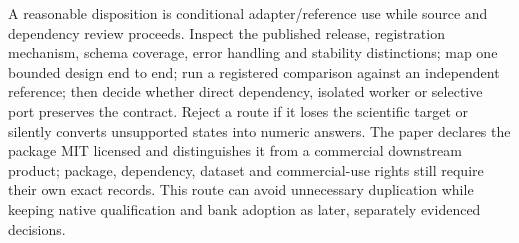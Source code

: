 A reasonable disposition is conditional adapter/reference use while source
and dependency review proceeds. Inspect the published release, registration
mechanism, schema coverage, error handling and stability distinctions; map
one bounded design end to end; run a registered comparison against an
independent reference; then decide whether direct dependency, isolated worker
or selective port preserves the contract. Reject a route if it loses the
scientific target or silently converts unsupported states into numeric
answers. The paper declares the package MIT licensed and distinguishes it
from a commercial downstream product; package, dependency, dataset and
commercial-use rights still require their own exact records. This route
can avoid unnecessary duplication while keeping native qualification and
bank adoption as later, separately evidenced decisions.
